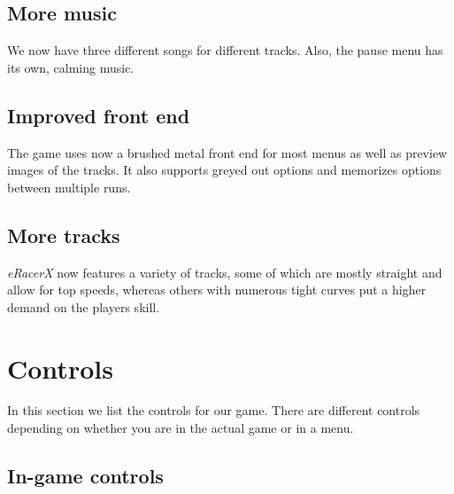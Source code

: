 \documentclass[11pt]{article}
\begin{document}
\subsection{More music}

We now have three different songs for different tracks. Also, the pause menu
has its own, calming music.

\subsection{Improved front end}

The game uses now a brushed metal front end for most menus as well as preview
images of the tracks. It also supports greyed out options and memorizes options
between multiple runs.

\subsection{More tracks}

\emph{eRacerX} now features a variety of tracks, some of which are mostly
straight and allow for top speeds, whereas others with numerous tight curves put
a higher demand on the players skill.

\appendix

\section{Controls}
\label{controls}

In this section we list the controls for our game. There are different controls
depending on whether you are in the actual game or in a menu. 

\subsection{In-game controls}
\end{document}
